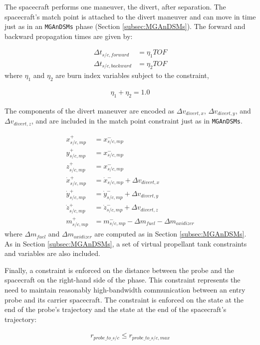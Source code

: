The spacecraft performs one maneuver, the divert, after separation. The spacecraft's match point is attached to the divert maneuver and can move in time just as in an \texttt{MGAnDSMs} phase (Section \ref{subsec:MGAnDSMs}). The forward and backward propagation times are given by:

\begin{align}
\Delta t_{s/c,forward} &= \eta_1 TOF\\
\Delta t_{s/c,backward} &= \eta_2 TOF
\end{align}
%
where $\eta_1$ and $\eta_2$ are burn index variables subject to the constraint,

\begin{align}
\eta_1 + \eta_2 = 1.0
\end{align}

The components of the divert maneuver are encoded as $\Delta v_{divert,x}$, $\Delta v_{divert,y}$, and $\Delta v_{divert,z}$, and are included in the match point constraint just as in \texttt{MGAnDSMs}.

\begin{align}
x_{s/c,mp}^+ &= x_{s/c,mp}^-\\
y_{s/c,mp}^+ &= x_{s/c,mp}^-\\
z_{s/c,mp}^+ &= x_{s/c,mp}^-\\
\dot x_{s/c,mp}^+ &= \dot x_{s/c,mp}^- + \Delta v_{divert,x}\\
\dot y_{s/c,mp}^+ &= \dot y_{s/c,mp}^- + \Delta v_{divert,y}\\
\dot z_{s/c,mp}^+ &= \dot z_{s/c,mp}^- + \Delta v_{divert,z}\\	
m_{s/c,mp}^+ &= m_{s/c,mp}^- - \Delta m_{fuel} - \Delta m_{oxidizer}
\end{align}
%
where $\Delta m_{fuel}$ and $\Delta m_{oxidizer}$ are computed as in Section \ref{subsec:MGAnDSMs}. As in Section \ref{subsec:MGAnDSMs}, a set of virtual propellant tank constraints and variables are also included.

Finally, a constraint is enforced on the distance between the probe and the spacecraft on the right-hand side of the phase. This constraint represents the need to maintain reasonably high-bandwidth communication between an entry probe and its carrier spacecraft. The constraint is enforced on the state at the end of the probe's trajectory and the state at the end of the spacecraft's trajectory:

\begin{align}
r_{probe\_to\_s/c} \leq r_{probe\_to\_s/c, max}
\end{align}

